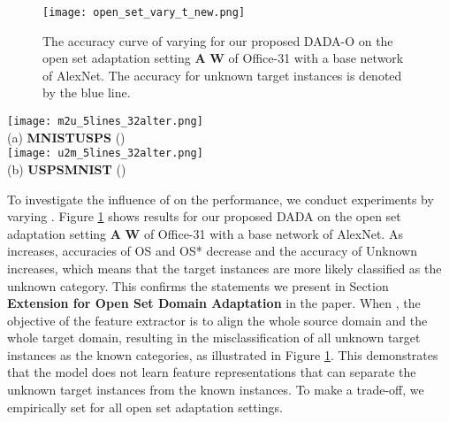 \documentclass[letterpaper]{article} \usepackage{aaai20}  \usepackage{times}  \usepackage{helvet} \usepackage{courier}  \usepackage[hyphens]{url}  \usepackage{graphicx} \urlstyle{rm} \def\UrlFont{\rm}  \usepackage{graphicx}  \frenchspacing  \setlength{\pdfpagewidth}{8.5in}  \setlength{\pdfpageheight}{11in}
\begin{document}
\begin{figure}[ht]
	\begin{center}
\texttt{[image: open\_set\_vary\_t\_new.png]}
	\end{center}
	\caption{The accuracy curve of varying  for our proposed DADA-O on the open set adaptation setting \textbf{A}  \textbf{W} of Office-31 with a base network of AlexNet. The accuracy for unknown target instances is denoted by the blue line.}
	\label{fig:open_set_vary_t}
\end{figure}

\begin{figure*}[!t]
	\begin{center} 


\texttt{[image: m2u\_5lines\_32alter.png]} \\
		(a) \textbf{MNIST}\textbf{USPS} () \\
\texttt{[image: u2m\_5lines\_32alter.png]} \\
		(b) \textbf{USPS}\textbf{MNIST} () \\
	\end{center}
	\caption{Training processes in terms of the test error of the target data for each epoch, the test error of the target data for each epoch of adversarial training, the training error of the source data for each epoch, the rate of source instances failing to satisfy the condition for each epoch, and the rate of source instances failing to satisfy the condition for each epoch when no target data is used in the adversarial training, on the two adaptation settings of (a) \textbf{MNIST}\textbf{USPS} and (b) \textbf{USPS}\textbf{MNIST}.}
	\label{fig:training_process}
\end{figure*} 

To investigate the influence of  on the performance, we conduct experiments by varying . Figure \ref{fig:open_set_vary_t} shows results for our proposed DADA on the open set adaptation setting \textbf{A}  \textbf{W} of Office-31 with a base network of AlexNet. As  increases, accuracies of OS and OS* decrease and the accuracy of Unknown increases, which means that the target instances are more likely classified as the unknown category. This confirms the statements we present in Section \textbf{Extension for Open Set Domain Adaptation} in the paper. When , the objective of the feature extractor is to align the whole source domain and the whole target domain, resulting in the misclassification of all unknown target instances as the known categories, as illustrated in Figure \ref{fig:open_set_vary_t}. This demonstrates that the model does not learn feature representations that can separate the unknown target instances from the known instances. To make a trade-off, we empirically set  for all open set adaptation settings.
\end{document}
